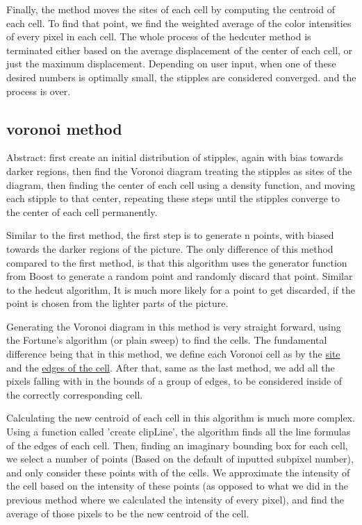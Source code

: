 \documentclass[11pt]{article}
\begin{document}
Finally, the method moves the sites of each cell by computing the centroid of each cell. To find that point, we find the weighted average of the color intensities of every pixel in each cell. The whole process of the hedcuter method is terminated either based on the average displacement of the center of each cell, or just the maximum displacement. Depending on user input, when one of these desired numbers is optimally small, the stipples are considered converged. and the process is over.

\subsection{voronoi method}

Abstract: first create an initial distribution of stipples, again with bias towards darker regions, then find the Voronoi diagram treating the stipples as sites of the diagram, then finding the center of each cell using a density function, and moving each stipple to that center, repeating these steps until the stipples converge to the center of each cell permanently.

Similar to the first method, the first step is to generate n points, with biased towards the darker regions of the picture. The only difference of this method compared to the first method, is that this algorithm uses the generator function from Boost to generate a random point and randomly discard that point. Similar to the hedcut algorithm, It is much more likely for a point to get discarded, if the point is chosen from the lighter parts of the picture. 

Generating the Voronoi diagram in this method is very straight forward, using the Fortune's algorithm (or plain sweep) to find the cells. The fundamental difference being that in this method, we define each Voronoi cell as by the \underline{site} and the \underline{edges of the cell}. After that, same as the last method, we add all the pixels falling with in the bounds of a group of edges, to be considered inside of the correctly corresponding cell.

 Calculating the new centroid of each cell in this algorithm is much more complex. Using a function called 'create clipLine', the algorithm finds all the line formulas of the edges of each cell. Then, finding an imaginary bounding box for each cell, we select a number of points (Based on the default of inputted subpixel number), and only consider these points with of the cells. We approximate the intensity of the cell based on the intensity of these points (as opposed to what we did in the previous method where we calculated the intensity of every pixel), and find the average of those pixels to be the new centroid of the cell. 
\end{document}
